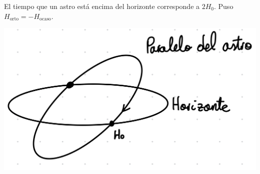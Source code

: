 	
	 \begin{minipage}{.45\textwidth} 	
	 	El tiempo que un astro está encima del horizonte corresponde a $2H_0$. Puso $H_{\text{orto}}=-H_{\text{ocaso}}$.
	 \end{minipage}	\hfill
	 \begin{minipage}{0.45\textwidth}
	 	\includegraphics[width=1.0\textwidth]{Cuerpo/Imagenes/01_Ejercicio_2.jpg}
	 \end{minipage}
	
	
